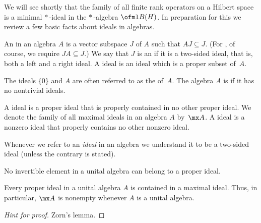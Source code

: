 We will see shortly that the family of all finite rank operators on a Hilbert space is a minimal $*\,$-ideal in the
$*\,$-algebra $\ofml B(H)$.  In preparation for this we review a few basic facts about ideals in algebras.

\begin{defn}\label{000551} An
 in an algebra $A$ is a vector subspace $J$ of $A$ such that $AJ \subseteq J$. (For
, of course, we require $JA \subseteq J$.)  We say that $J$ is an
 if it is a two-sided ideal, that is, both a left and a right ideal.  A
 ideal is an ideal which is a proper subset of~$A$.

The ideals $\{0\}$ and $A$ are often referred to as the
 of~$A$. The algebra $A$ is
 if it has no nontrivial ideals.

A
 ideal is a proper ideal that is properly contained in no other proper ideal.
We denote the family of all maximal ideals in an algebra $A$
by~$\mx A$.  A
 ideal is a nonzero ideal that properly contains no other nonzero ideal.
\end{defn}

\begin{conv} Whenever we refer to an \emph{ideal} in an algebra we understand it to be a
two-sided ideal (unless the contrary is stated).
\end{conv}

\begin{prop} No invertible element in a unital algebra can belong to a proper ideal.
\end{prop}

 \begin{prop}\label{000552} Every proper ideal in a unital algebra $A$ is contained in a
 maximal ideal. Thus, in particular, $\mx A$ is nonempty whenever $A$ is a unital algebra.
\end{prop}

\begin{proof}[\emph{Hint for proof}] Zorn's lemma. \ns  \end{proof}


